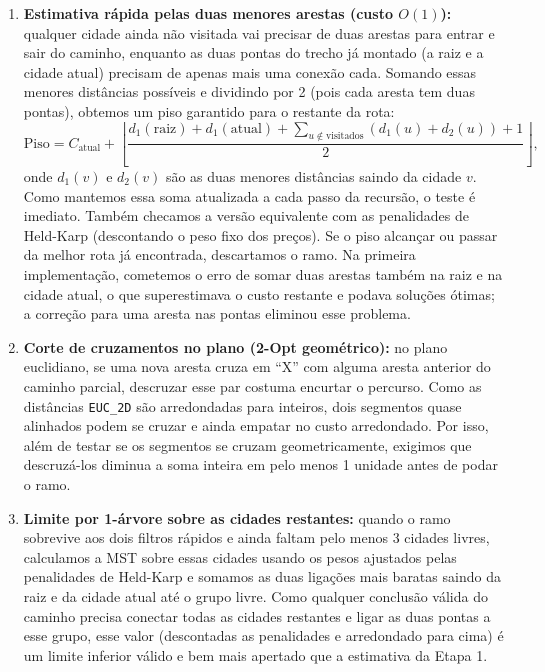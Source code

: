 \documentclass[12pt]{article}
\begin{document}
\begin{enumerate}
  \item \textbf{Estimativa rápida pelas duas menores arestas (custo $O(1)$):} qualquer cidade ainda não visitada vai precisar de duas arestas para entrar e sair do caminho, enquanto as duas pontas do trecho já montado (a raiz e a cidade atual) precisam de apenas mais uma conexão cada. Somando essas menores distâncias possíveis e dividindo por 2 (pois cada aresta tem duas pontas), obtemos um piso garantido para o restante da rota:
  \begin{equation}
    \text{Piso} = C_{\text{atual}} + \left\lfloor \frac{d_1(\text{raiz}) + d_1(\text{atual}) + \sum_{u \notin \text{visitados}} (d_1(u) + d_2(u)) + 1}{2} \right\rfloor,
  \end{equation}
  onde $d_1(v)$ e $d_2(v)$ são as duas menores distâncias saindo da cidade $v$. Como mantemos essa soma atualizada a cada passo da recursão, o teste é imediato. Também checamos a versão equivalente com as penalidades de Held-Karp (descontando o peso fixo dos preços). Se o piso alcançar ou passar da melhor rota já encontrada, descartamos o ramo. Na primeira implementação, cometemos o erro de somar duas arestas também na raiz e na cidade atual, o que superestimava o custo restante e podava soluções ótimas; a correção para uma aresta nas pontas eliminou esse problema.

  \item \textbf{Corte de cruzamentos no plano (2-Opt geométrico):} no plano euclidiano, se uma nova aresta cruza em ``X'' com alguma aresta anterior do caminho parcial, descruzar esse par costuma encurtar o percurso. Como as distâncias \texttt{EUC\_2D} são arredondadas para inteiros, dois segmentos quase alinhados podem se cruzar e ainda empatar no custo arredondado. Por isso, além de testar se os segmentos se cruzam geometricamente, exigimos que descruzá-los diminua a soma inteira em pelo menos 1 unidade antes de podar o ramo.

  \item \textbf{Limite por 1-árvore sobre as cidades restantes:} quando o ramo sobrevive aos dois filtros rápidos e ainda faltam pelo menos 3 cidades livres, calculamos a MST sobre essas cidades usando os pesos ajustados pelas penalidades de Held-Karp e somamos as duas ligações mais baratas saindo da raiz e da cidade atual até o grupo livre. Como qualquer conclusão válida do caminho precisa conectar todas as cidades restantes e ligar as duas pontas a esse grupo, esse valor (descontadas as penalidades e arredondado para cima) é um limite inferior válido e bem mais apertado que a estimativa da Etapa 1.
\end{enumerate}
\end{document}
